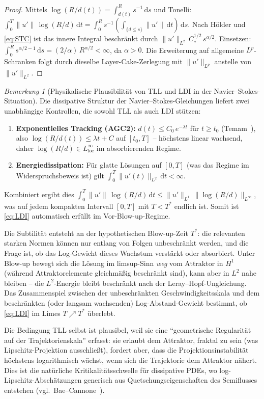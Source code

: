 \documentclass[12pt,a4paper]{article}
\theoremstyle{definition}
\theoremstyle{plain}
\theoremstyle{remark}
\newtheorem{remark}[definition]{Bemerkung}
\begin{document}
\begin{proof}
Mittels $\log(R/d(t)) = \int_{d(t)}^R s^{-1}\,\mathrm{d}s$ und Tonelli:
$\int_0^T \|u'\|\,\log(R/d)\,\mathrm{d}t
= \int_0^R s^{-1}(\int_{\{d \le s\}} \|u'\|\,\mathrm{d}t)\,\mathrm{d}s$.
Nach H\"older und \eqref{eq:STC} ist das innere Integral beschränkt durch
$\|u'\|_{L^2}\,C_*^{1/2}\,s^{\alpha/2}$. Einsetzen:
$\int_0^R s^{\alpha/2-1}\,\mathrm{d}s = (2/\alpha)\,R^{\alpha/2} < \infty$,
da $\alpha > 0$.
Die Erweiterung auf allgemeine $L^p$-Schranken folgt durch dieselbe
Layer-Cake-Zerlegung mit $\|u'\|_{L^p}$ anstelle von $\|u'\|_{L^2}$.
\end{proof}

\begin{remark}[Physikalische Plausibilität von TLL und LDI in der
Navier--Stokes-Situation]
\label{rem:LDI-plausibility}
Die dissipative Struktur der Navier--Stokes-Gleichungen liefert
zwei unabhängige Kontrollen, die sowohl TLL als auch LDI stützen:
\begin{enumerate}[label=(\roman*)]
  \item \textbf{Exponentielles Tracking (AGC2):}\;
    $d(t) \le C_0\,e^{-\lambda t}$ für $t \ge t_0$
    (Temam~\cite{Temam2001}), also
    $\log(R/d(t)) \le \lambda t + C$ auf $[t_0, T]$ -- höchstens
    linear wachsend, daher $\log(R/d) \in L^\infty_{\mathrm{loc}}$
    im absorbierenden Regime.
  \item \textbf{Energiedissipation:}\;
    Für glatte Lösungen auf $[0,T]$ (was das Regime im
    Widerspruchsbeweis ist) gilt
    $\int_0^T \|u'(t)\|_{L^2}\,\mathrm{d}t < \infty$.
\end{enumerate}
Kombiniert ergibt dies
$\int_0^T \|u'\|\,\log(R/d)\,\mathrm{d}t
\le \|u'\|_{L^1}\,\|\log(R/d)\|_{L^\infty}$,
was auf jedem kompakten Intervall $[0,T]$ mit
$T < T^*$ endlich ist. Somit ist \eqref{eq:LDI} automatisch erfüllt
im Vor-Blow-up-Regime.

Die Subtilität entsteht an der hypothetischen Blow-up-Zeit $T^*$:
die relevanten starken Normen können nur entlang von Folgen unbeschränkt
werden, und die Frage ist, ob das Log-Gewicht dieses Wachstum verstärkt oder
absorbiert. Unter Blow-up bewegt sich die Lösung im limsup-Sinn
\emph{weg} vom Attraktor in $H^1$ (während Attraktorelemente gleichmäßig
beschränkt sind), kann aber in $L^2$ nahe bleiben -- die $L^2$-Energie bleibt
beschränkt nach der Leray--Hopf-Ungleichung. Das Zusammenspiel zwischen der
unbeschränkten Geschwindigkeitsskala und dem beschränkten (oder langsam
wachsenden) Log-Abstand-Gewicht bestimmt, ob \eqref{eq:LDI}
im Limes $T \nearrow T^*$ überlebt.

Die Bedingung TLL selbst ist plausibel, weil sie eine
``geometrische Regularität auf der Trajektorienskala'' erfasst: sie erlaubt dem
Attraktor, fraktal zu sein (was Lipschitz-Projektion ausschließt), fordert aber,
dass die Projektionsinstabilität höchstens logarithmisch wächst,
wenn sich die Trajektorie dem Attraktor nähert.
Dies ist die natürliche Kritikalitätsschwelle für dissipative PDEs,
wo log-Lipschitz-Abschätzungen generisch aus Quetschungseigenschaften des Semiflusses
entstehen (vgl.\ Bae--Cannone~\cite{BaeCannone2016}).
\end{remark}
\end{document}
